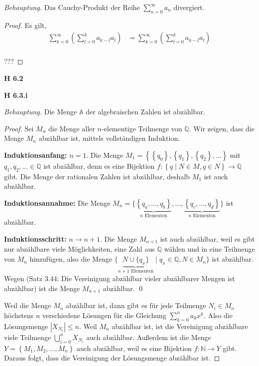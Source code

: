 \documentclass[12pt]{extarticle}
\begin{document}
\textit{Behauptung.}  Das Cauchy-Produkt der Reihe $
\sum_{n=0}^{\infty}{a_n}$ divergiert.

\begin{proof}
Es gilt,
\begin{align*}
  \sum_{k=0}^{\infty}{\left( \sum_{l=0}^k{a_{k-l}a_l} \right)}
  &= \sum_{k=0}^{\infty}{\left( \sum_{l=0}^k{a_{k-l}a_l} \right)} \\
\end{align*}

???
\end{proof}

\textbf{H 6.2}

\textbf{H 6.3.i}

\textit{Behauptung.} Die Menge \(\mathbb{A}\) der
algebraischen Zahlen ist abzählbar.

\begin{proof}
  Sei \(M_n\) die Menge aller \(n\)-elementige Teilmenge
  von \(\mathbb{Q}\).  Wir zeigen, dass die Menge \(M_n\)
  abzählbar ist, mittels vollständigen Induktion.

  \textbf{Induktionsanfang:} \(n=1\).  Die Menge
  $M_1 = \left\{ \left\{ q_0 \right\}, \left\{ q_1
    \right\}, \left\{ q_2 \right\}, \ldots \right\}$
  mit \(q_1, q_2, \ldots \in \mathbb{Q}\) ist abzählbar,
  denn es eine Bijektion
  $f \colon \left\{ q  \mid  N \in M, q \in N\right\}
  \rightarrow \mathbb{Q}$ gibt.  Die Menge der
  rationalen Zahlen ist abzählbar, deshalb \(M_1\) ist
  auch abzählbar.

  \textbf{Induktionsannahme:} Die Menge
  $M_n= \{ \underbrace{\left\{ q_a, \ldots, q_b
      \right\}}_{n \text{ Elementen}}, \ldots,
    \underbrace{\left\{ q_c, \ldots, q_d \right\}}_{n
      \text{ Elementen}} \}$ ist abzählbar.

    \textbf{Induktionsschritt:} \(n \rightarrow n+1\).
    Die Menge \(M_{n+1}\) ist auch abzählbar, weil es
    gibt nur abzählbare viele Möglichkeiten, eine Zahl
    aus \(\mathbb{Q}\) wählen und in eine Teilmenge von
    \(M_n\) hinzufügen, also die Menge
    $\{ \underbrace{ N \cup \{q_{x}\}}_{n+1 \text{ Elementen}}  \mid  q_x \in
    \mathbb{Q}, N \in M_n \}$ ist abzählbar.  Wegen (Satz 3.44:
    Die Vereinigung abzählbar vieler abzählbarer Mengen
    ist abzählbar) ist die Menge \(M_{n+1}\) abzählbar. \qed

    Weil die Menge \(M_n\) abzählbar ist, dann gibt es
    für jede Teilmenge \(N_i \in M_n\) höchstens \(n\)
    verschiedene Lösungen für die Gleichung
    \(\sum_{k=0}^n{a_kx^k}\).  Also die Lösungsmenge
    \(\left| X_{N_i}  \right| \leq n\).  Weil \(M_n\) abzählbar ist, ist die
    Vereinigung abzählbare viele Teilmenge
    \(\bigcup_{i=0}^n{X_{N_i}}\) auch abzählbar.
    Außerdem ist die Menge
    \(Y= \left\{ M_1, M_2, \ldots, M_n \right\}\) auch
    abzählbar, weil es eine Bijektion
    \(f\colon \mathbb{N} \rightarrow Y\) gibt.
    Daraus folgt, dass die Vereinigung der Lösungsmenge
    abzählbar ist.
  \end{proof}
\end{document}
